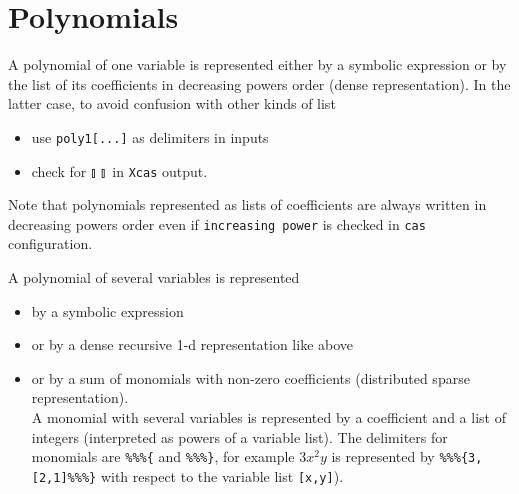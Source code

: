 \documentclass[a4paper,11pt]{book}
\begin{document}
\section{Polynomials}
A polynomial of one variable is represented either 
by a symbolic expression or by the list of its 
coefficients in decreasing powers order (dense representation).
In the latter case, to avoid confusion with other kinds of list
\begin{itemize}
\item use \verb|poly1[...]| as delimiters in inputs
\item check for $\talloblong \ \talloblong$ in {\tt Xcas} output.
\end{itemize}
Note that polynomials represented as lists of coefficients
are always written in decreasing powers order even if  
{\tt increasing power} is checked in  {\tt cas} configuration.

A polynomial of several variables is represented
\begin{itemize}
\item by a symbolic expression 
\item or by a dense recursive 1-d representation like above
\item or by a sum of
monomials with non-zero coefficients (distributed sparse
representation).\\
A monomial with several variables is represented by a coefficient and a
list of integers (interpreted as powers of a variable list). The 
delimiters for monomials are
{\tt \%\%\%\{} and  {\tt \%\%\%\}}, for example $3x^2y$ is represented by
{\tt \%\%\%\{3,[2,1]\%\%\%\}} with respect to the variable list 
{\tt [x,y]}).
\end{itemize} 
\end{document}
